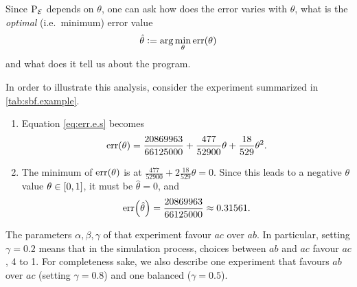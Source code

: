 \documentclass{article}
\begin{document}
Since \(\mathrm{P}_{{\cal E}}\) depends on \(\theta\), one can ask how does the error
varies with \(\theta\), what is the \emph{optimal} (i.e.\ minimum)
error value
\begin{equation}
	\hat{\theta} := \arg\min_\theta \err{\theta}\label{eq:opt.err}
\end{equation}
and what does it tell us about the program.

In order to illustrate this analysis, consider the experiment
summarized in \cref{tab:sbf.example}.

\begin{enumerate}
	\item Equation \eqref{eq:err.e.s} becomes \[
		      \err{\theta} = \frac{20869963}{66125000} + \frac{477}{52900}\theta + \frac{18}{529}\theta^2.
	      \]
	\item The minimum of \(\err{\theta}\) is at \(\frac{477}{52900} +
	      2\frac{18}{529}\theta = 0\).  Since this leads to a negative \(\theta\) value \(\theta \in \intcc{0,1}\), it must be \(\hat{\theta} = 0\), and \[
		      \err{\hat{\theta}} = \frac{20869963}{66125000} \approx 0.31561.
	      \]
\end{enumerate}

The parameters \(\alpha, \beta, \gamma\) of that experiment favour
\(ac\) over \(ab\).  In particular, setting \(\gamma = 0.2\) means
that in the simulation process, choices between \(ab\) and \(ac\)
favour \(ac\), 4 to 1.  For completeness sake, we also describe one
experiment that favours \(ab\) over \(ac\) (setting \(\gamma=0.8\))
and one balanced (\(\gamma=0.5\)).
\end{document}
